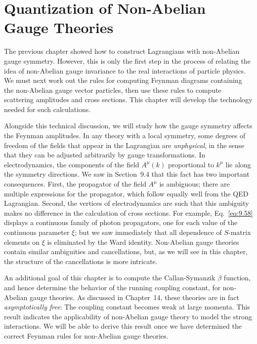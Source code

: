 \chapter{Quantization of Non-Abelian Gauge Theories}

The previous chapter showed how to construct Lagrangians with non-Abelian
gauge symmetry.  However, this is only the first step in the process of
relating the idea of non-Abelian gauge invariance to the real interactions of
particle physics.  We must next work out the rules for computing Feynman
diagrams containing the non-Abelian gauge vector particles, then use these
rules to compute scattering amplitudes and cross sections.  This chapter will
develop the technology needed for such calculations.

Alongside this technical discussion, we will study how the gauge symmetry
affects the Feynman amplitudes.  In any theory with a local symmetry, some
degrees of freedom of the fields that appear in the Lagrangian are
\emph{unphysical}, in the sense that they can be adjusted arbitrarily by gauge
transformations.  In electrodynamics, the components of the field $A^\mu(k)$
proportional to $k^\mu$ lie along the symmetry directions.  We saw in
Section~9.4 that this fact has two important consequences.  First, the
propagator of the field $A^\mu$ is ambiguous; there are multiple expressions
for the propagator, which follow equally well from the QED Lagrangian.
Second, the vertices of electrodynamics are such that this ambiguity makes no
difference in the calculation of cross sections.  For example,
Eq.~\eqref{eq:9.58} displays a continuous family of photon propagators, one
for each value of the continuous parameter $\xi$; but we saw immediately that
all dependence of $S$-matrix elements on $\xi$ is eliminated by the Ward
identity.  Non-Abelian gauge theories contain similar ambiguities and
cancellations, but, as we will see in this chapter, the structure of the
cancellations is more intricate.

An additional goal of this chapter is to compute the Callan-Symanzik
$\beta$ function, and hence determine the behavior of the running coupling
constant, for non-Abelian gauge theories.  As discussed in Chapter~14, these
theories are in fact \emph{asymptotically free}: The coupling constant
becomes weak at large momenta.  This result indicates the applicability of
non-Abelian gauge theory to model the strong interactions.  We will be able
to derive this result once we have determined the correct Feynman rules for
non-Abelian gauge theories.

